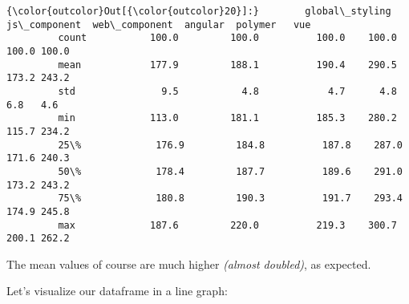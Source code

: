 \documentclass[11pt]{article}
\begin{document}
\begin{Verbatim}[commandchars=\\\{\}]
{\color{outcolor}Out[{\color{outcolor}20}]:}        global\_styling  js\_component  web\_component  angular  polymer   vue
         count           100.0         100.0          100.0    100.0    100.0 100.0
         mean            177.9         188.1          190.4    290.5    173.2 243.2
         std               9.5           4.8            4.7      4.8      6.8   4.6
         min             113.0         181.1          185.3    280.2    115.7 234.2
         25\%             176.9         184.8          187.8    287.0    171.6 240.3
         50\%             178.4         187.7          189.6    291.0    173.2 243.2
         75\%             180.8         190.3          191.7    293.4    174.9 245.8
         max             187.6         220.0          219.3    300.7    200.1 262.2
\end{Verbatim}
            
    The mean values of course are much higher \emph{(almost doubled)}, as
expected.

Let's visualize our dataframe in a line graph:
\end{document}
